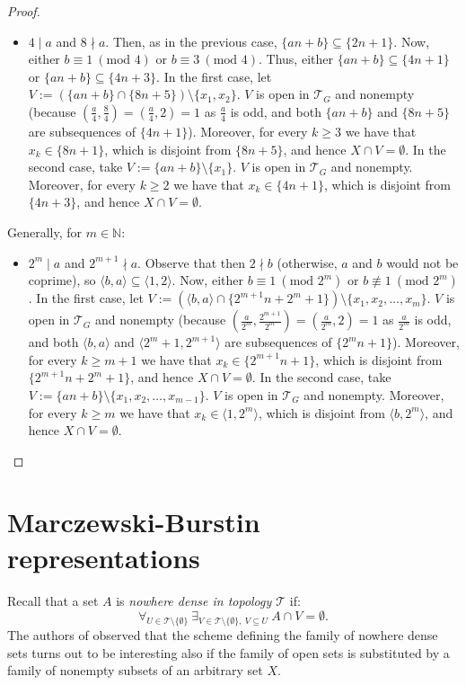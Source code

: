 \documentclass{amsart}
\theoremstyle{definition}
\newcommand{\N}{{\mathbb N}}
\newcommand{\T}{\mathcal{T}}
\newcommand{\modulo}{\textrm{mod }}
\newcommand{\arithseq}[2]{\langle#2, #1\rangle}
\begin{document}
\begin{proof}
\begin{itemize}
 \item $4\mid a$ and $8\nmid a$. Then, as in the previous case, $\{an+b\}\subseteq \{2n+1\}$. Now, either $b\equiv 1\ (\modulo 4)$ or $b\equiv 3\ (\modulo 4)$. Thus, either $\{an+b\}\subseteq \{4n+1\}$ or $\{an+b\}\subseteq \{4n+3\}$. In the first case, let $V := (\{an+b\} \cap \{8n+5\})\setminus\{x_1, x_2\}$. $V$ is open in $\T_G$ and nonempty (because $\left(\frac{a}{4},\frac{8}{4}\right)=\left(\frac{a}{4},2\right)=1$ as $\frac{a}{4}$ is odd, and both $\{an+b\}$ and $\{8n+5\}$ are subsequences of $\{4n+1\}$). Moreover, for every $k\geq 3$ we have that $x_k\in \{8n+1\}$, which is disjoint from $\{8n+5\}$, and hence $X\cap V = \emptyset$. In the second case, take $V := \{an+b\} \setminus\{x_1\}$. $V$ is open in $\T_G$ and nonempty. Moreover, for every $k\geq 2$ we have that $x_k\in \{4n+1\}$, which is disjoint from $\{4n+3\}$, and hence $X\cap V = \emptyset$.
\end{itemize}
Generally, for $m\in\N$:
\begin{itemize}
 \item $2^m\mid a$ and $2^{m+1}\nmid a$. Observe that then $2 \nmid b$ (otherwise, $a$ and $b$ would not be coprime), so $\arithseq{a}{b}\subseteq \arithseq{2}{1}$. Now, either $b\equiv 1\ (\modulo 2^m)$ or $b \not\equiv 1\ (\modulo 2^m)$. In the first case, let $V := (\arithseq{a}{b} \cap \{2^{m+1}n+2^m+1\})\setminus\{x_1, x_2,\ldots, x_m\}$. $V$ is open in $\T_G$ and nonempty (because $\left(\frac{a}{2^m},\frac{2^{m+1}}{2^m}\right)=\left(\frac{a}{2^m},2\right)=1$ as $\frac{a}{2^m}$ is odd, and both $\arithseq{a}{b}$ and $\arithseq{2^{m+1}}{2^m+1}$ are subsequences of $\{2^m n+1\}$). Moreover, for every $k\geq m+1$ we have that $x_k\in \{2^{m+1}n+1\}$, which is disjoint from $\{2^{m+1}n+2^m+1\}$, and hence $X\cap V = \emptyset$. In the second case, take $V := \{an+b\} \setminus\{x_1, x_2,\ldots, x_{m-1}\}$. $V$ is open in $\T_G$ and nonempty. Moreover, for every $k\geq m$ we have that $x_k\in \arithseq{2^m}{1}$, which is disjoint from $\arithseq{2^m}{b}$, and hence $X\cap V = \emptyset$.
\end{itemize}
\end{proof}


\section{Marczewski-Burstin representations}

Recall that a set $A$ is \emph{nowhere dense in topology $\T$} if:
$$\forall_{U\in\T\setminus\{\emptyset\}}\ \exists_{V\in\T\setminus\{\emptyset\},\ V\subseteq U}\ A\cap V = \emptyset.$$
The authors of \cite{MB} observed that the scheme defining the family of nowhere dense sets turns out to be interesting also if the family of open sets is substituted by a family of nonempty subsets of an arbitrary set $X$.
\end{document}
